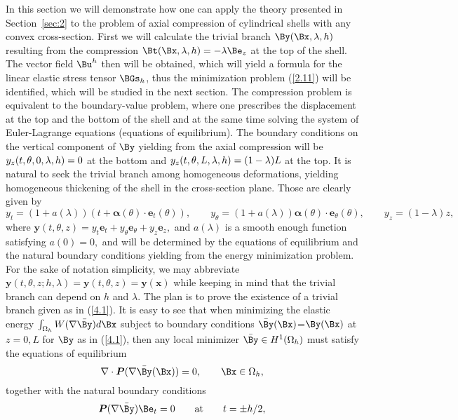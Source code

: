 In this section we will demonstrate how one can apply the theory presented in Section~\ref{sec:2} to the problem of axial compression of cylindrical shells with any convex cross-section. First we will calculate the trivial branch $\By(\Bx,\lambda,h)$ resulting from the compression $\Bt(\Bx,\lambda,h)=-\lambda \Be_z$
at the top of the shell. The vector field $\Bu^h$ then will be obtained, which will yield a formula for the linear elastic stress tensor $\BGs_h$, thus the minimization problem (\ref{2.11}) will be identified, which will be studied in the next section. The compression problem is equivalent to the boundary-value problem, where one prescribes the displacement at the top and the bottom of the shell and at the same time solving the system of Euler-Lagrange equations (equations of equilibrium). The boundary conditions on the vertical component of $\By$ yielding from the axial compression will be $y_z(t,\theta,0,\lambda,h)=0$ at the bottom and $y_z(t,\theta,L,\lambda,h)=(1-\lambda)L$ at the top. It is natural to seek the trivial branch among homogeneous deformations, yielding homogeneous thickening of the shell in the cross-section plane. Those are clearly given by 
\begin{equation}
\label{4.1}
y_t=(1+a(\lambda))(t+\bm\alpha(\theta)\cdot \bm e_t(\theta)), \qquad y_\theta=(1+a(\lambda))\bm\alpha(\theta)\cdot \bm e_\theta(\theta), \qquad y_z=(1-\lambda)z, 
\end{equation}
where $\bm y(t,\theta,z)=y_t \bm e_t+y_\theta \bm e_\theta+y_z\bm e_z,$ and $a(\lambda)$ is a smooth enough function satisfying $a(0)=0,$ and will be determined by the equations of equilibrium and the natural boundary conditions yielding from the energy minimization problem. For the sake of notation simplicity, we may abbreviate $\bm y(t,\theta,z;h,\lambda)=\bm y(t,\theta,z)=\bm y(\bm x)$ while keeping in mind that the trivial branch can depend on $h$ and $\lambda$. The plan is to prove the existence of a trivial branch given as in (\ref{4.1}). It is easy to see that when minimizing the elastic energy $\int_{\Omega_h} W(\nabla \bar \By)d\Bx$ subject to boundary conditions $\bar \By(\Bx)$=$\By(\Bx)$ at $z=0,L$ for $\By$ as in (\ref{4.1}), then any local minimizer $\bar \By\in H^1(\Omega_h)$ must satisfy the equations of equilibrium 
\begin{equation}
\label{4.2}
\nabla\cdot \bm P(\nabla \bar\By(\Bx))=0, \qquad \Bx\in \Omega_h,
\end{equation}
together with the natural boundary conditions 
\begin{equation}
\label{4.3}
\bm P(\nabla \bar\By) \Be_t=0 \qquad\text{at}\qquad t=\pm h/2,
\end{equation}
